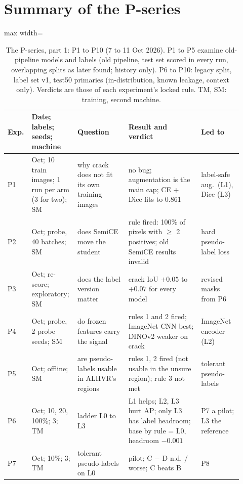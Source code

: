 \section{Summary of the P-series}\label{sec:pseries-summary}

\begin{table}[htbp]
\centering\footnotesize
\caption{The P-series, part 1: P1 to P10 (7 to 11 Oct 2026). P1 to P5 examine old-pipeline models and labels (old pipeline, test set
scored in every run, overlapping splits as later found; history only). P6 to P10: legacy split, label set v1, test50 primaries
(in-distribution, known leakage, context only). Verdicts are those of each experiment's locked rule. TM, SM: training, second machine.}
\label{tab:pseries-sum1}
\begin{adjustbox}{max width=\linewidth}
\begin{tabular}{@{}>{\raggedright\arraybackslash}p{0.07\linewidth}>{\raggedright\arraybackslash}p{0.17\linewidth}>{\raggedright\arraybackslash}p{0.21\linewidth}>{\raggedright\arraybackslash}p{0.30\linewidth}>{\raggedright\arraybackslash}p{0.17\linewidth}@{}}
\toprule
Exp. & Date; labels; seeds; machine & Question & Result and verdict & Led to \\
\midrule
P1 & 8 Oct; 10 train images; 1 run per arm (3 for two); SM & why crack does not fit its own training images & no bug; augmentation is the main cap; CE + Dice fits to 0.861 & label-safe aug.\ (L1), Dice (L3) \\
P2 & 8 Oct; probe, 40 batches; SM & does SemiCE move the student & rule fired: 100\% of pixels with $\geq$ 2 positives; old SemiCE results invalid & hard pseudo-label loss \\
P3 & 10 Oct; re-score; exploratory; SM & does the label version matter & crack IoU $+0.05$ to $+0.07$ for every model & revised masks from P6 \\
P4 & 10 Oct; probe, 2 probe seeds; SM & do frozen features carry the signal & rules 1 and 2 fired; ImageNet CNN best; DINOv2 weaker on crack & ImageNet encoder (L2) \\
P5 & 10 Oct; offline; SM & are pseudo-labels usable in ALHVR's regions & rules 1, 2 fired (not usable in the unsure region); rule 3 not met & tolerant pseudo-labels \\
P6 & 10 Oct; 10, 20, 100\%; 3; TM & ladder L0 to L3 & L1 helps; L2, L3 hurt AP; only L3 has label headroom; base by rule = L0, headroom $-0.001$ & P7 a pilot; L3 the reference \\
P7 & 10 Oct; 10\%; 3; TM & tolerant pseudo-labels on L0 & pilot; C $-$ D n.d. / worse; C beats B & P8 \\

\end{tabular}
\end{adjustbox}
\end{table}
